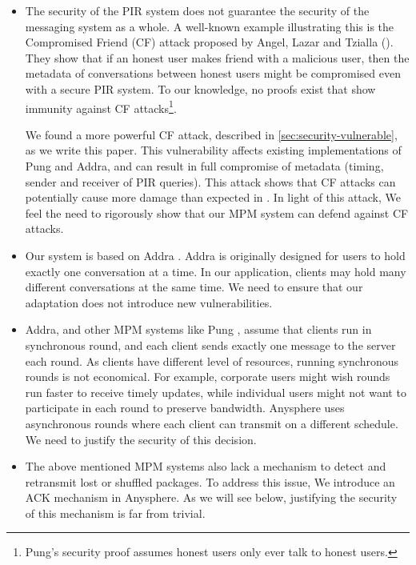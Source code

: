 \begin{itemize}
    \item The security of the PIR system does not guarantee the security of the messaging system as a whole. A well-known example illustrating this is the Compromised Friend (CF) attack proposed by Angel, Lazar and Tzialla (\cite{angel2018cf}). They show that if an honest user makes friend with a malicious user, then the metadata of conversations between honest users might be compromised even with a secure PIR system. To our knowledge, no proofs exist that show immunity against CF attacks\footnote{Pung's security proof \cite[Appendix C]{angel2018thesis} assumes honest users only ever talk to honest users.}. 
    
    We found a more powerful CF attack, described in \cref{sec:security-vulnerable}, as we write this paper. This vulnerability affects existing implementations of Pung and Addra, and can result in full compromise of metadata (timing, sender and receiver of PIR queries). This attack shows that CF attacks can potentially cause more damage than expected in \cite{angel2018cf}. In light of this attack, We feel the need to rigorously show that our MPM system can defend against CF attacks.
    
    \item Our system is based on Addra \cite{ahmad2021addra}. Addra is originally designed for users to hold exactly one conversation at a time. In our application, clients may hold many different conversations at the same time. We need to ensure that our adaptation does not introduce new vulnerabilities.
    
    \item Addra, and other MPM systems like Pung \cite{angel2016unobservable}, assume that clients run in synchronous round, and each client sends exactly one message to the server each round. As clients have different level of resources, running synchronous rounds is not economical. For example, corporate users might wish rounds run faster to receive timely updates, while individual users might not want to participate in each round to preserve bandwidth. Anysphere uses asynchronous rounds where each client can transmit on a different schedule. We need to justify the security of this decision.
    
    \item The above mentioned MPM systems also lack a mechanism to detect and retransmit lost or shuffled packages. To address this issue, We introduce an ACK mechanism in Anysphere. As we will see below, justifying the security of this mechanism is far from trivial.
\end{itemize}

